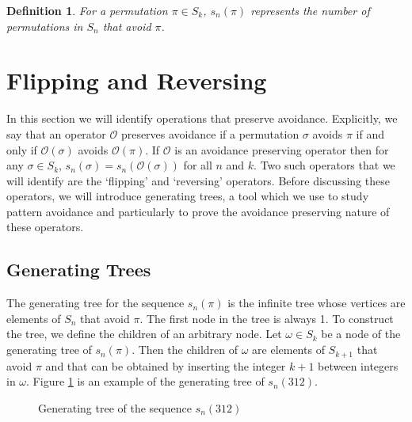 \documentclass[11pt,letterpaper,twoside,english]{article}
\theoremstyle{theorem}
\newtheorem{definition}[theorem]{Definition}
\theoremstyle{remark}
\begin{document}
\begin{definition}
For a permutation $\pi\in S_k$, $s_n(\pi)$ represents the number of permutations in $S_n$ that avoid $\pi$. 
\end{definition}



\section{Flipping and Reversing}

In this section we will identify operations that preserve avoidance. Explicitly, we say that an operator $\mathcal{O}$ preserves avoidance if a permutation $\sigma$ avoids $\pi$ if and only if $\mathcal{O}(\sigma)$ avoids $\mathcal{O}(\pi)$. If $\mathcal{O}$ is an avoidance preserving operator then for any $\sigma\in S_k$, $s_n(\sigma)=s_n(\mathcal{O}(\sigma))$ for all $n$ and $k$. Two such operators that we will identify are the `flipping' and `reversing' operators.  Before discussing these operators, we will introduce generating trees, a tool which we use to study pattern avoidance and particularly to prove the avoidance preserving nature of these operators. 

\subsection{Generating Trees}

The generating tree for the sequence $s_n(\pi)$ is the infinite tree whose vertices are elements of $S_n$ that avoid $\pi$. The first node in the tree is always 1. To construct the tree, we define the children of an arbitrary node. Let $\omega\in S_k$ be a node of the generating tree of $s_n(\pi)$. Then the children of $\omega$ are elements of $S_{k+1}$ that avoid $\pi$ and that can be obtained by inserting the integer $k+1$ between integers in $\omega$. Figure \ref{fig:M1} is an example of the generating tree of $s_n(312)$. 

\begin{figure}[h!]
\caption{Generating tree of the sequence $s_n(312)$} \label{fig:M1}
\end{figure}
\end{document}
